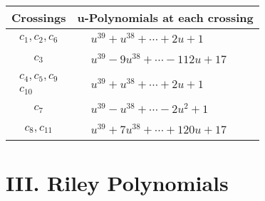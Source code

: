 \documentclass[1p]{elsarticle_modified}
\theoremstyle{definition}
\begin{document}
\begin{tabular}{m{50pt}|m{274pt}}
Crossings & \hspace{64pt}u-Polynomials at each crossing \\
\hline $$\begin{aligned}c_{1},c_{2},c_{6}\end{aligned}$$&$\begin{aligned}
&u^{39}+u^{38}+\cdots+2 u+1
\end{aligned}$\\
\hline $$\begin{aligned}c_{3}\end{aligned}$$&$\begin{aligned}
&u^{39}-9 u^{38}+\cdots-112 u+17
\end{aligned}$\\
\hline $$\begin{aligned}c_{4},c_{5},c_{9}\\c_{10}\end{aligned}$$&$\begin{aligned}
&u^{39}+u^{38}+\cdots+2 u+1
\end{aligned}$\\
\hline $$\begin{aligned}c_{7}\end{aligned}$$&$\begin{aligned}
&u^{39}- u^{38}+\cdots-2 u^2+1
\end{aligned}$\\
\hline $$\begin{aligned}c_{8},c_{11}\end{aligned}$$&$\begin{aligned}
&u^{39}+7 u^{38}+\cdots+120 u+17
\end{aligned}$\\
\hline
\end{tabular}\newpage\renewcommand{\arraystretch}{1}
\centering \section*{ III. Riley Polynomials}
\end{document}
